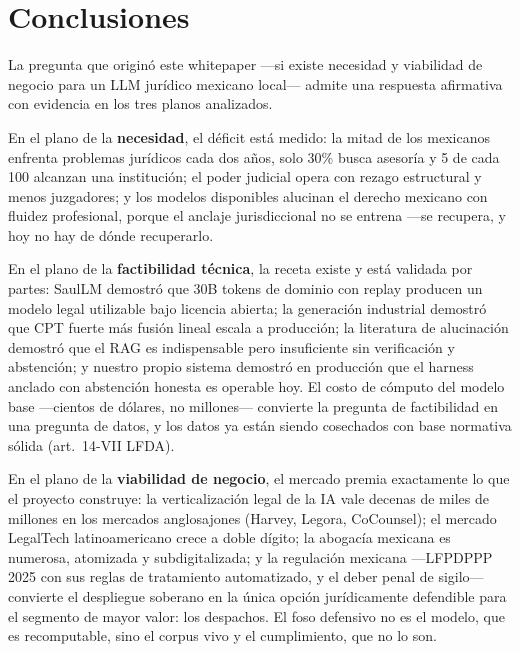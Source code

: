 \section{Conclusiones}\label{sec:conclusiones}

La pregunta que originó este whitepaper ---si existe necesidad y viabilidad de negocio para un LLM jurídico mexicano local--- admite una respuesta afirmativa con evidencia en los tres planos analizados.

En el plano de la \textbf{necesidad}, el déficit está medido: la mitad de los mexicanos enfrenta problemas jurídicos cada dos años, solo 30\% busca asesoría y 5 de cada 100 alcanzan una institución;\cite{wjpmx2019,justiciaabierta2025} el poder judicial opera con rezago estructural y menos juzgadores;\cite{eleconomista2025} y los modelos disponibles alucinan el derecho mexicano con fluidez profesional, porque el anclaje jurisdiccional no se entrena ---se recupera, y hoy no hay de dónde recuperarlo.\cite{dahl2024,magesh2025}

En el plano de la \textbf{factibilidad técnica}, la receta existe y está validada por partes: SaulLM demostró que 30B tokens de dominio con replay producen un modelo legal utilizable bajo licencia abierta;\cite{colombo2024} la generación industrial demostró que CPT fuerte más fusión lineal escala a producción; la literatura de alucinación demostró que el RAG es indispensable pero insuficiente sin verificación y abstención;\cite{magesh2025,ailawlibrarians2026} y nuestro propio sistema demostró en producción que el harness anclado con abstención honesta es operable hoy. El costo de cómputo del modelo base ---cientos de dólares, no millones--- convierte la pregunta de factibilidad en una pregunta de datos, y los datos ya están siendo cosechados con base normativa sólida (art.~14-VII LFDA).\cite{lfda}

En el plano de la \textbf{viabilidad de negocio}, el mercado premia exactamente lo que el proyecto construye: la verticalización legal de la IA vale decenas de miles de millones en los mercados anglosajones (Harvey, Legora, CoCounsel);\cite{harvey2026,sacra2026} el mercado LegalTech latinoamericano crece a doble dígito;\cite{imarc2025} la abogacía mexicana es numerosa, atomizada y subdigitalizada;\cite{mirada360,computerweekly2025} y la regulación mexicana ---LFPDPPP 2025 con sus reglas de tratamiento automatizado, y el deber penal de sigilo--- convierte el despliegue soberano en la única opción jurídicamente defendible para el segmento de mayor valor: los despachos.\cite{lfpdppp,cosio2026,cpf} El foso defensivo no es el modelo, que es recomputable, sino el corpus vivo y el cumplimiento, que no lo son.


